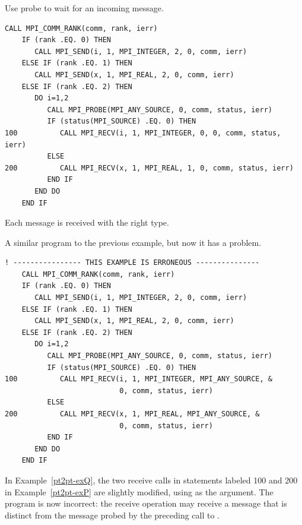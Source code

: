 \begin{example}
\label{pt2pt-exP}
%
%
Use probe to wait for an incoming message.

\begin{lstlisting}[language={[MPI]Fortran}]
    CALL MPI_COMM_RANK(comm, rank, ierr)
    IF (rank .EQ. 0) THEN
       CALL MPI_SEND(i, 1, MPI_INTEGER, 2, 0, comm, ierr)
    ELSE IF (rank .EQ. 1) THEN
       CALL MPI_SEND(x, 1, MPI_REAL, 2, 0, comm, ierr)
    ELSE IF (rank .EQ. 2) THEN
       DO i=1,2
          CALL MPI_PROBE(MPI_ANY_SOURCE, 0, comm, status, ierr)
          IF (status(MPI_SOURCE) .EQ. 0) THEN
100          CALL MPI_RECV(i, 1, MPI_INTEGER, 0, 0, comm, status, ierr)
          ELSE
200          CALL MPI_RECV(x, 1, MPI_REAL, 1, 0, comm, status, ierr)
          END IF
       END DO
    END IF
\end{lstlisting}
Each message is received with the right type.
\end{example}


\begin{example}
\label{pt2pt-exQ}
%
%
A similar program to the previous example, but now it
has a problem.

\begin{lstlisting}[language={[MPI]Fortran}]
! ---------------- THIS EXAMPLE IS ERRONEOUS ---------------
    CALL MPI_COMM_RANK(comm, rank, ierr)
    IF (rank .EQ. 0) THEN
       CALL MPI_SEND(i, 1, MPI_INTEGER, 2, 0, comm, ierr)
    ELSE IF (rank .EQ. 1) THEN
       CALL MPI_SEND(x, 1, MPI_REAL, 2, 0, comm, ierr)
    ELSE IF (rank .EQ. 2) THEN
       DO i=1,2
          CALL MPI_PROBE(MPI_ANY_SOURCE, 0, comm, status, ierr)
          IF (status(MPI_SOURCE) .EQ. 0) THEN
100          CALL MPI_RECV(i, 1, MPI_INTEGER, MPI_ANY_SOURCE, &
                           0, comm, status, ierr)
          ELSE
200          CALL MPI_RECV(x, 1, MPI_REAL, MPI_ANY_SOURCE, &
                           0, comm, status, ierr)
          END IF
       END DO
    END IF
\end{lstlisting}

In Example~\ref{pt2pt-exQ},
the two receive calls in statements labeled 100 and 200 in
Example~\ref{pt2pt-exP} are
slightly modified,
using  as the 
argument.
The program is now incorrect: the receive operation may receive a message that
is distinct from the message probed by the preceding call to
.
\end{example}

